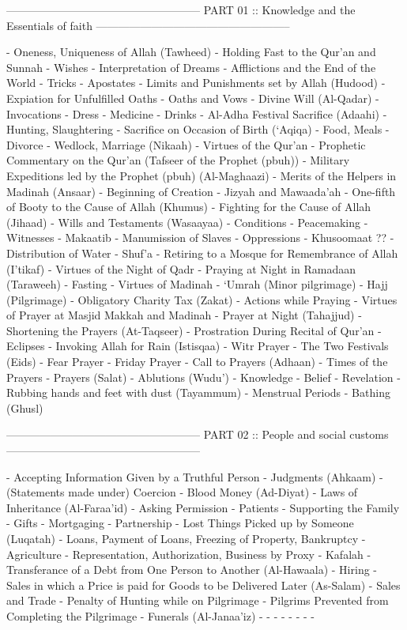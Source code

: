 -----------------------------------------------------
PART 01 :: Knowledge and the Essentials of faith
-----------------------------------------------------

	- Oneness, Uniqueness of Allah (Tawheed)
	- Holding Fast to the Qur'an and Sunnah
	- Wishes
	- Interpretation of Dreams
	- Afflictions and the End of the World
	- Tricks
	- Apostates
	- Limits and Punishments set by Allah (Hudood)
	- Expiation for Unfulfilled Oaths
	- Oaths and Vows
	- Divine Will (Al-Qadar)
	- Invocations
	- Dress
	- Medicine
	- Drinks
	- Al-Adha Festival Sacrifice (Adaahi)
	- Hunting, Slaughtering
	- Sacrifice on Occasion of Birth (`Aqiqa)
	- Food, Meals
	- Divorce
	- Wedlock, Marriage (Nikaah)
	- Virtues of the Qur'an
	- Prophetic Commentary on the Qur'an (Tafseer of the Prophet (pbuh))
	- Military Expeditions led by the Prophet (pbuh) (Al-Maghaazi)
	- Merits of the Helpers in Madinah (Ansaar)
	- Beginning of Creation
	- Jizyah and Mawaada'ah
	- One-fifth of Booty to the Cause of Allah (Khumus)
	- Fighting for the Cause of Allah (Jihaad)
	- Wills and Testaments (Wasaayaa)
	- Conditions
	- Peacemaking
	- Witnesses
	- Makaatib
	- Manumission of Slaves
	- Oppressions
	- Khusoomaat ??
	- Distribution of Water
	- Shuf'a
	- Retiring to a Mosque for Remembrance of Allah (I'tikaf)
	- Virtues of the Night of Qadr
	- Praying at Night in Ramadaan (Taraweeh)
	- Fasting
	- Virtues of Madinah
	- `Umrah (Minor pilgrimage)
	- Hajj (Pilgrimage)
	- Obligatory Charity Tax (Zakat)
	- Actions while Praying
	- Virtues of Prayer at Masjid Makkah and Madinah
	- Prayer at Night (Tahajjud)
	- Shortening the Prayers (At-Taqseer)
	- Prostration During Recital of Qur'an
	- Eclipses
	- Invoking Allah for Rain (Istisqaa)
	- Witr Prayer
	- The Two Festivals (Eids)
	- Fear Prayer
	- Friday Prayer
	- Call to Prayers (Adhaan)
	- Times of the Prayers
	- Prayers (Salat)
	- Ablutions (Wudu')
	- Knowledge
	- Belief
	- Revelation
	- Rubbing hands and feet with dust (Tayammum)
	- Menstrual Periods
	- Bathing (Ghusl)


-----------------------------------------------------
PART 02 :: People and social customs
-----------------------------------------------------

	- Accepting Information Given by a Truthful Person
	- Judgments (Ahkaam)
	- (Statements made under) Coercion
	- Blood Money (Ad-Diyat)
	- Laws of Inheritance (Al-Faraa'id)
	- Asking Permission
	- Patients
	- Supporting the Family
	- Gifts
	- Mortgaging
	- Partnership
	- Lost Things Picked up by Someone (Luqatah)
	- Loans, Payment of Loans, Freezing of Property, Bankruptcy
	- Agriculture
	- Representation, Authorization, Business by Proxy
	- Kafalah
	- Transferance of a Debt from One Person to Another (Al-Hawaala)
	- Hiring
	- Sales in which a Price is paid for Goods to be Delivered Later (As-Salam)
	- Sales and Trade
	- Penalty of Hunting while on Pilgrimage
	- Pilgrims Prevented from Completing the Pilgrimage
	- Funerals (Al-Janaa'iz)
	-
	-
	-
	-
	-
	-
	-
	-


